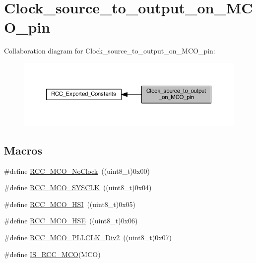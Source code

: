 \hypertarget{group___clock__source__to__output__on___m_c_o__pin}{}\section{Clock\+\_\+source\+\_\+to\+\_\+output\+\_\+on\+\_\+\+M\+C\+O\+\_\+pin}
\label{group___clock__source__to__output__on___m_c_o__pin}
Collaboration diagram for Clock\+\_\+source\+\_\+to\+\_\+output\+\_\+on\+\_\+\+M\+C\+O\+\_\+pin\+:
\nopagebreak
\begin{figure}[H]
\begin{center}
\leavevmode
\includegraphics[width=350pt]{group___clock__source__to__output__on___m_c_o__pin}
\end{center}
\end{figure}
\subsection*{Macros}
\begin{DoxyCompactItemize}
\item 
\#define \hyperlink{group___clock__source__to__output__on___m_c_o__pin_ga1f39ff9f5606d3ad56e221d253be17d3}{R\+C\+C\+\_\+\+M\+C\+O\+\_\+\+No\+Clock}~((uint8\+\_\+t)0x00)
\item 
\#define \hyperlink{group___clock__source__to__output__on___m_c_o__pin_gab766ad89492ffe915de3438aaa96891b}{R\+C\+C\+\_\+\+M\+C\+O\+\_\+\+S\+Y\+S\+C\+LK}~((uint8\+\_\+t)0x04)
\item 
\#define \hyperlink{group___clock__source__to__output__on___m_c_o__pin_ga7206cdf03826781dc4fb1b094475d744}{R\+C\+C\+\_\+\+M\+C\+O\+\_\+\+H\+SI}~((uint8\+\_\+t)0x05)
\item 
\#define \hyperlink{group___clock__source__to__output__on___m_c_o__pin_ga8bd64bbefd2a725a0cfe2f2902dd9b0f}{R\+C\+C\+\_\+\+M\+C\+O\+\_\+\+H\+SE}~((uint8\+\_\+t)0x06)
\item 
\#define \hyperlink{group___clock__source__to__output__on___m_c_o__pin_ga1ce4233675bd7bdcb0220ed10ee7d8be}{R\+C\+C\+\_\+\+M\+C\+O\+\_\+\+P\+L\+L\+C\+L\+K\+\_\+\+Div2}~((uint8\+\_\+t)0x07)
\item 
\#define \hyperlink{group___clock__source__to__output__on___m_c_o__pin_ga0c2d4d6aa8881e01b8c06d8816284b73}{I\+S\+\_\+\+R\+C\+C\+\_\+\+M\+CO}(M\+CO)
\end{DoxyCompactItemize}



